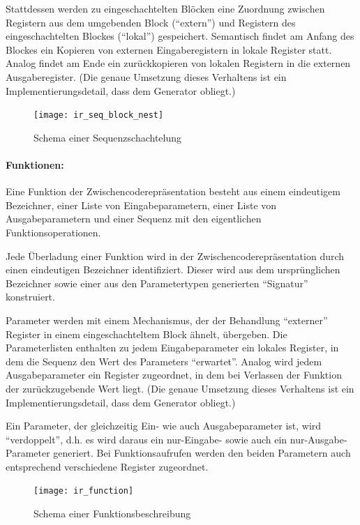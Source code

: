 \documentclass[twoside,a4paper,fleqn,12pt]{article}
\begin{document}
Stattdessen werden zu eingeschachtelten Blöcken eine Zuordnung zwischen Registern aus dem umgebenden Block
("`extern"') und
Registern des eingeschachtelten Blockes ("`lokal"') gespeichert.
Semantisch findet am Anfang des Blockes ein Kopieren von externen Eingaberegistern
in lokale Register statt. Analog findet am Ende ein zurückkopieren von lokalen Registern in die externen Ausgaberegister.
(Die genaue Umsetzung dieses Verhaltens ist ein Implementierungsdetail, dass dem Generator obliegt.)

\begin{figure}[h]
   \centering
  \texttt{[image: ir\_seq\_block\_nest]}
  \caption{Schema einer Sequenzschachtelung}
  \label{fig:ir_seq_block_nest}
\end{figure}

\paragraph{Funktionen:}
Eine Funktion der Zwischencoderepräsentation besteht aus einem eindeutigem Bezeichner, einer Liste von Eingabeparametern,
einer Liste von Ausgabeparametern und einer Sequenz mit den eigentlichen Funktionsoperationen.

Jede Überladung einer Funktion wird in der Zwischencoderepräsentation durch einen eindeutigen Bezeichner identifiziert.
Dieser wird aus dem ursprünglichen Bezeichner sowie einer aus den Parametertypen generierten "`Signatur"' konstruiert.

Parameter werden mit einem Mechanismus, der der Behandlung "`externer"' Register in einem eingeschachteltem
Block ähnelt, übergeben. Die Parameterlisten enthalten zu jedem Eingabeparameter ein lokales Register, in dem die
Sequenz den Wert des Parameters "`erwartet"'. Analog wird jedem Ausgabeparameter ein Register zugeordnet,
in dem bei Verlassen der Funktion der zurückzugebende Wert liegt.
(Die genaue Umsetzung dieses Verhaltens ist ein Implementierungsdetail, dass dem Generator obliegt.)

Ein Parameter, der gleichzeitig Ein- wie auch Ausgabeparameter ist, wird "`verdoppelt"', d.h. es wird daraus
ein nur-Eingabe- sowie auch ein nur-Ausgabe-Parameter generiert. Bei Funktionsaufrufen werden den beiden
Parametern auch entsprechend verschiedene Register zugeordnet.

\begin{figure}[h]
   \centering
  \texttt{[image: ir\_function]}
  \caption{Schema einer Funktionsbeschreibung}
  \label{fig:ir_function}
\end{figure}
\end{document}
